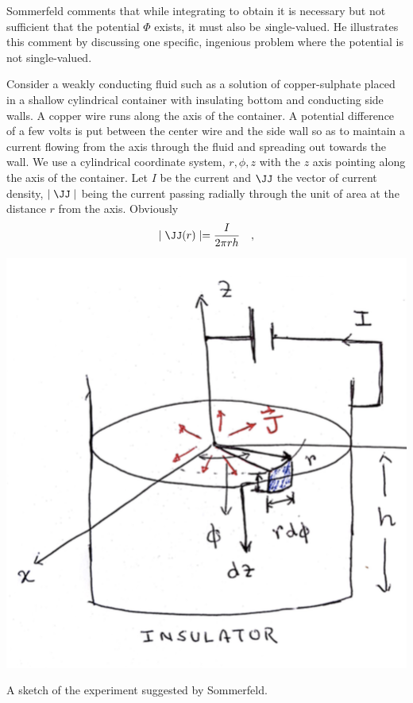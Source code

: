 \documentclass{tufte-book} %
\begin{document}
Sommerfeld comments that while integrating 
to obtain  it is necessary but not sufficient that the potential $\Phi$
exists, it must also be {\textit single-valued}. He illustrates this
comment by discussing one specific, ingenious problem where the potential is not
single-valued. 

Consider a weakly conducting fluid such as a solution
of copper-sulphate placed in a shallow cylindrical container with
insulating bottom and conducting side walls. A copper wire runs along
the axis of the container. A potential difference of a few volts is
put between the center wire and the side wall so as to maintain a
current flowing from the axis through the fluid and spreading out
towards the wall.
We use a cylindrical coordinate system, $r,\phi,z$ with the $z$ axis
pointing along the axis of the container. 
 Let $I$ be the current and $\JJ$ the vector of
current density, $\mid \JJ \mid$ being the current passing radially
through the unit of area at the distance $r$ from the axis. Obviously
\begin{equation}
\mid \JJ(r) \mid = \frac{I}{2\pi r h}\quad,
\end{equation}
\begin{marginfigure}
\includegraphics{figures/SomExp.png}
\caption{A sketch of the experiment suggested by Sommerfeld. }
\end{marginfigure}
\end{document}
